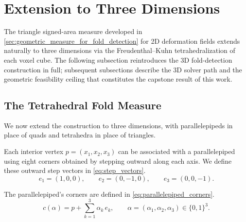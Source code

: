 \documentclass[lettersize,journal]{IEEEtran}
\begin{document}
\begin{table}[ht]\centering
\caption{TODO (deferred result): Central-difference blindness false-negative rates on real DVFs. Each row is a DVF source. Columns: total folded cells (triangulated measure), cells missed by central differences (\%), cells falsely flagged by central differences (\%).}
\label{tab:blindness}
\end{table}

\section{Extension to Three Dimensions}
\label{sec:3d_extension}

The triangle signed-area measure developed in \autoref{sec:geometric_measure_for_fold_detection} for 2D deformation fields extends naturally to three dimensions via the Freudenthal--Kuhn tetrahedralization of each voxel cube. The following subsection reintroduces the 3D fold-detection construction in full; subsequent subsections describe the 3D solver path and the geometric feasibility ceiling that constitutes the capstone result of this work.

\subsection{The Tetrahedral Fold Measure}
\label{sec:3d_fold_detection}

We now extend the construction to three dimensions, with parallelepipeds in place of quads and tetrahedra in place of triangles.

Each interior vertex $p = (x_1, x_2, x_3)$ can be associated with a parallelepiped using eight corners obtained by stepping outward along each axis. We define these outward step vectors in \autoref{eq:step_vectors}.
\begin{equation}
    \label{eq:step_vectors} e_1 = (1, 0, 0), \qquad e_2 = (0, -1, 0), \qquad e_3 = (0, 0, -1).
\end{equation}

The parallelepiped's corners are defined in \autoref{eq:parallelepiped_corners}.
\begin{equation}
    \label{eq:parallelepiped_corners} c(\alpha) = p + \sum_{k=1}^{3} \alpha_k\, e_k, \qquad \alpha = (\alpha_1, \alpha_2, \alpha_3) \in \{0, 1\}^3.
\end{equation}
\end{document}
